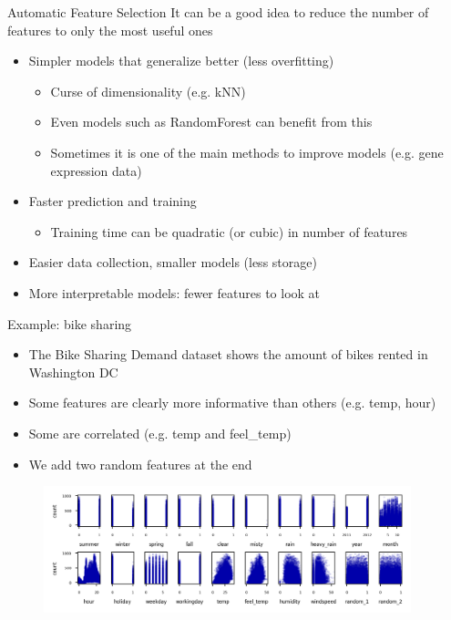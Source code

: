 \begin{frame}{Automatic Feature Selection}
It can be a good idea to reduce the number of features to only the most useful ones

\begin{itemize}
    \item Simpler models that generalize better (less overfitting)
    \begin{itemize}
        \item Curse of dimensionality (e.g. kNN)
        \item Even models such as RandomForest can benefit from this
        \item Sometimes it is one of the main methods to improve models (e.g. gene expression data)
    \end{itemize}
    
    \item Faster prediction and training
    \begin{itemize}
        \item Training time can be quadratic (or cubic) in number of features
    \end{itemize}
    
    \item Easier data collection, smaller models (less storage)
    
    \item More interpretable models: fewer features to look at
\end{itemize}
\end{frame}


\begin{frame}{Example: bike sharing}
\begin{itemize}
    \item The Bike Sharing Demand dataset shows the amount of bikes rented in Washington DC
    \item Some features are clearly more informative than others (e.g. temp, hour)
    \item Some are correlated (e.g. temp and feel\_temp)
    \item We add two random features at the end
\end{itemize}

\begin{figure}
    \centering
    \includegraphics[width=0.95\textwidth,keepaspectratio]{images/pre-processing/bike_sharing.png}
\end{figure}
\end{frame}


